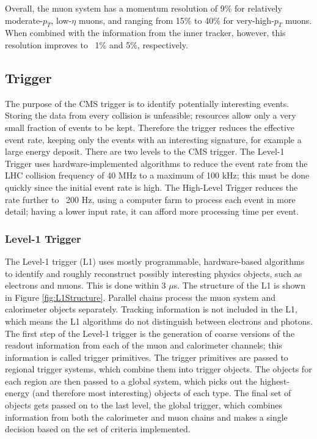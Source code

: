 Overall, the muon system has a momentum resolution 
of 9\% for relatively moderate-$p_T$, low-$\eta$ muons, 
and ranging from 15\% to 40\% for very-high-$p_T$ muons.  
When combined with the information from the inner tracker, 
however, this resolution improves to ~1\% and 5\%, respectively.  

\subsection{Trigger}
\label{exp:trigger}
The purpose of the CMS trigger is to 
identify potentially interesting events.  
Storing the data from every collision is unfeasible; 
resources allow only a very small fraction of events to be kept.  
Therefore the trigger reduces the effective event rate, 
keeping only the events with an interesting signature, 
for example a large energy deposit.  
There are two levels to the CMS trigger.  
The Level-1 Trigger uses hardware-implemented algorithms to 
reduce the event rate from the LHC collision frequency of 40 MHz 
to a maximum of 100 kHz; 
this must be done quickly since the initial event rate is high. 
The High-Level Trigger reduces the rate further to ~200 Hz, %
using a computer farm to process each event in more detail; 
having a lower input rate, it can afford more processing time per event.  


\subsubsection{Level-1 Trigger}
\label{exp:L1}

The Level-1 trigger (L1) \cite{TriggerTDR} 
uses mostly programmable, hardware-based algorithms 
to identify and roughly reconstruct possibly interesting physics objects, 
such as electrons and muons.  
This is done within 3 $\mu$s.  
The structure of the L1 is shown in Figure \ref{fig:L1Structure}.  
Parallel chains process the muon system and calorimeter objects separately. 
Tracking information is not included in the L1, 
which means the L1 algorithms do not distinguish 
between electrons and photons. 
The first step of the Level-1 trigger is the generation 
of coarse versions of the readout information 
from each of the muon and calorimeter channels; 
this information is called trigger primitives.  
The trigger primitives are passed to regional trigger systems, 
which combine them into trigger objects.  
The objects for each region are then passed to a global system, 
which picks out the highest-energy (and therefore most interesting) 
objects of each type.
The final set of objects gets passed on to the last level, 
the global trigger, which combines information from both 
the calorimeter and muon chains 
and makes a single decision based on the set of criteria implemented.  


